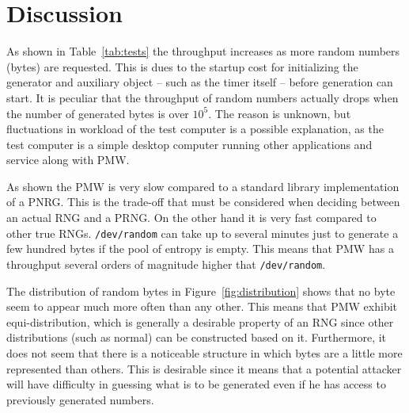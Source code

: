 \section{Discussion}
\label{sec:discussion}
As shown in Table~\ref{tab:tests} the throughput increases as more random numbers (bytes) are requested.
This is dues to the startup cost for initializing the generator and auxiliary object -- such as the timer itself -- before generation can start.
It is peculiar that the throughput of random numbers actually drops when the number of generated bytes is over $10^5$.
The reason is unknown, but fluctuations in workload of the test computer is a possible explanation, as the test computer is a simple desktop computer running other applications and service along with PMW.

As shown the PMW is very slow compared to a standard library implementation of a PNRG.
This is the trade-off that must be considered when deciding between an actual RNG and a PRNG.
On the other hand it is very fast compared to other true RNGs.
\texttt{/dev/random} can take up to several minutes just to generate a few hundred bytes if the pool of entropy is empty.
This means that PMW has a throughput several orders of magnitude higher that \texttt{/dev/random}.

The distribution of random bytes in Figure~\ref{fig:distribution} shows that no byte seem to appear much more often than any other.
This means that PMW exhibit equi-distribution, which is generally a desirable property of an RNG since other distributions (such as normal) can be constructed based on it.
Furthermore, it does not seem that there is a noticeable structure in which bytes are a little more represented than others.
This is desirable since it means that a potential attacker will have difficulty in guessing what is to be generated even if he has access to previously generated numbers.